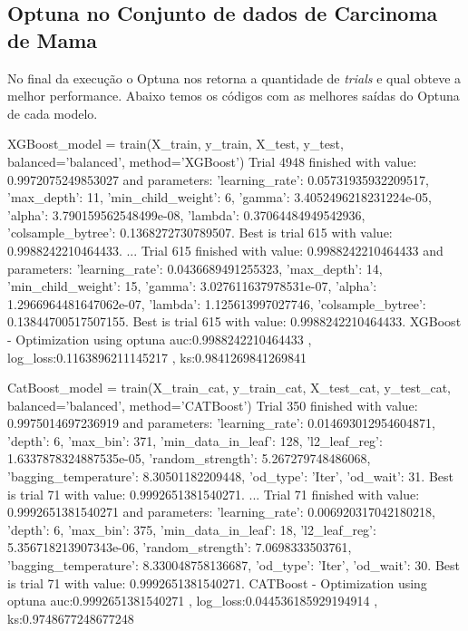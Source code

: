 \subsection{Optuna no Conjunto de dados de Carcinoma de Mama}
No final da execução o Optuna nos retorna a quantidade de \textit{trials} e qual obteve a melhor performance. Abaixo temos os códigos com as melhores saídas do Optuna de cada modelo.
\begin{codigo}[caption={Resultado do Optuna no conjunto de dados de Carcinoma de Mama.}, label={codigo:res:op:can}, language=Python, breaklines=true]
XGBoost_model = train(X_train, y_train, X_test, y_test, balanced='balanced', method='XGBoost')
Trial 4948 finished with value: 0.9972075249853027 and parameters: {'learning_rate': 0.05731935932209517, 'max_depth': 11, 'min_child_weight': 6, 'gamma': 3.4052496218231224e-05, 'alpha': 3.790159562548499e-08, 'lambda': 0.37064484949542936, 'colsample_bytree': 0.1368272730789507}. Best is trial 615 with value: 0.9988242210464433.
...
Trial 615 finished with value: 0.9988242210464433 and parameters: {'learning_rate': 0.0436689491255323, 'max_depth': 14, 'min_child_weight': 15, 'gamma': 3.027611637978531e-07, 'alpha': 1.2966964481647062e-07, 'lambda': 1.125613997027746, 'colsample_bytree': 0.13844700517507155}. Best is trial 615 with value: 0.9988242210464433.
XGBoost - Optimization using optuna
auc:0.9988242210464433 , log_loss:0.1163896211145217 , ks:0.9841269841269841

CatBoost_model = train(X_train_cat, y_train_cat, X_test_cat, y_test_cat, balanced='balanced', method='CATBoost')
Trial 350 finished with value: 0.9975014697236919 and parameters: {'learning_rate': 0.014693012954604871, 'depth': 6, 'max_bin': 371, 'min_data_in_leaf': 128, 'l2_leaf_reg': 1.6337878324887535e-05, 'random_strength': 5.267279748486068, 'bagging_temperature': 8.30501182209448, 'od_type': 'Iter', 'od_wait': 31}. Best is trial 71 with value: 0.9992651381540271.
...
Trial 71 finished with value: 0.9992651381540271 and parameters: {'learning_rate': 0.006920317042180218, 'depth': 6, 'max_bin': 375, 'min_data_in_leaf': 18, 'l2_leaf_reg': 5.356718213907343e-06, 'random_strength': 7.0698333503761, 'bagging_temperature': 8.330048758136687, 'od_type': 'Iter', 'od_wait': 30}. Best is trial 71 with value: 0.9992651381540271.
CATBoost - Optimization using optuna
auc:0.9992651381540271 , log_loss:0.044536185929194914 , ks:0.9748677248677248


\end{codigo}
